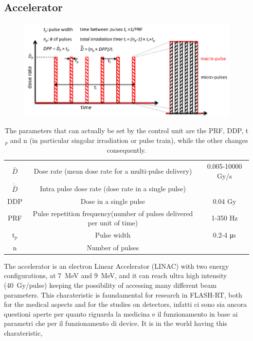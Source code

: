    \subsection{Accelerator}
      \begin{figure}
         \centering
         \includegraphics[width=.9\linewidth]{figures/test_beam/beam_structure.pdf}
         \caption{}
         \label{fig:beam_structure}
      \end{figure}
      \begin{table}
         \begin{center}
         \begin{tabular}{| c | c | c |}
         \hline
      $\bar{D}$ & Dose rate (mean dose rate for a multi-pulse delivery) & 0.005-10000 Gy/s\\
      $\Dot{\bar{D}}$ & Intra pulse dose rate (dose rate in a single pulse) &    \\
      DDP & Dose in a single pulse & 0.04 Gy\\
      PRF & Pulse repetition frequency(number of pulses delivered per unit of time) & 1-350 Hz\\
      t$_{p}$ & Pulse width & 0.2-4 \si{\us}\\
      n & Number of pulses &  \\
      \hline
         \end{tabular}
         \caption{The parameters that can actually be set by the control unit are the PRF, DDP, t$_p$ and n (in particular singolar irradiation or pulse train), while the other changes consequently.}
         \label{tab:beam_parameters}
         \end{center}
      \end{table}  
      The accelerator is an electron Linear Accelerator (LINAC) with two energy configurations, at \SI{7}{MeV} and \SI{9}{MeV}, and it can reach ultra high intensity (\SI{40}{Gy/pulse}) keeping the possibility of accessing many different beam parameters. This charateristic is faundamental for research in FLASH-RT, both for the medical aspects and for the studies on detectors, infatti ci sono sia ancora questioni aperte per quanto riguarda la medicina e il funzionamento in base ai parametri che per il funzionamento di device. 
      It is  in the world having this charateristic, 
      
